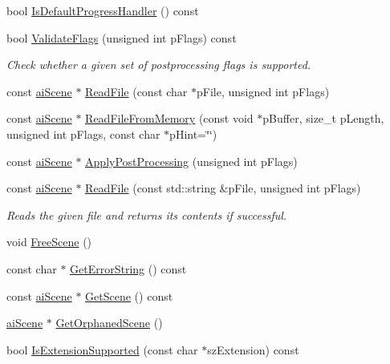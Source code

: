 \begin{DoxyCompactItemize}
\item 
bool \hyperlink{class_assimp_1_1_importer_a2d60d970eddf8f9d35b6e9b54214cedd}{Is\-Default\-Progress\-Handler} () const 
\item 
bool \hyperlink{class_assimp_1_1_importer_a780329e2dd0406e930291cf8ab9deb99}{Validate\-Flags} (unsigned int p\-Flags) const 
\begin{DoxyCompactList}\small\item\em Check whether a given set of postprocessing flags is supported. \end{DoxyCompactList}\item 
const \hyperlink{structai_scene}{ai\-Scene} $\ast$ \hyperlink{class_assimp_1_1_importer_a174418ab41d5b8bc51a044895cb991e5}{Read\-File} (const char $\ast$p\-File, unsigned int p\-Flags)
\item 
const \hyperlink{structai_scene}{ai\-Scene} $\ast$ \hyperlink{class_assimp_1_1_importer_a9b3c5e8b1042702f449e84a95b3324f6}{Read\-File\-From\-Memory} (const void $\ast$p\-Buffer, size\-\_\-t p\-Length, unsigned int p\-Flags, const char $\ast$p\-Hint=\char`\"{}\char`\"{})
\item 
const \hyperlink{structai_scene}{ai\-Scene} $\ast$ \hyperlink{class_assimp_1_1_importer_a5872e749c1451fee64183fc14f1fc81d}{Apply\-Post\-Processing} (unsigned int p\-Flags)
\item 
const \hyperlink{structai_scene}{ai\-Scene} $\ast$ \hyperlink{class_assimp_1_1_importer_a339882c7acb47d5b5110bbd078d870a9}{Read\-File} (const std\-::string \&p\-File, unsigned int p\-Flags)
\begin{DoxyCompactList}\small\item\em Reads the given file and returns its contents if successful. \end{DoxyCompactList}\item 
void \hyperlink{class_assimp_1_1_importer_a53dafc3046abc33365a07c605716c5d4}{Free\-Scene} ()
\item 
const char $\ast$ \hyperlink{class_assimp_1_1_importer_a23bab5ba8cb9b6886c690a610766668b}{Get\-Error\-String} () const 
\item 
const \hyperlink{structai_scene}{ai\-Scene} $\ast$ \hyperlink{class_assimp_1_1_importer_a26fd479a6a955969c1377fa59f92db66}{Get\-Scene} () const 
\item 
\hyperlink{structai_scene}{ai\-Scene} $\ast$ \hyperlink{class_assimp_1_1_importer_a60eb9042fb85bfbd61a863e131a56ecd}{Get\-Orphaned\-Scene} ()
\item 
bool \hyperlink{class_assimp_1_1_importer_a9146ea75c33c0aac0310195346877388}{Is\-Extension\-Supported} (const char $\ast$sz\-Extension) const 

\end{DoxyCompactItemize}
